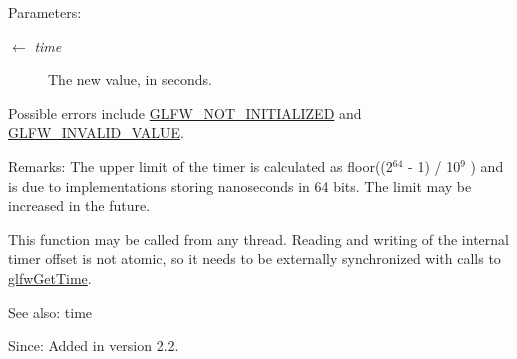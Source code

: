 \begin{Desc}
\item[Parameters:]
\begin{description}
\item[\mbox{$\leftarrow$} {\em time}]The new value, in seconds.\end{description}
\end{Desc}
Possible errors include \hyperlink{group__errors_g2374ee02c177f12e1fa76ff3ed15e14a}{GLFW\_\-NOT\_\-INITIALIZED} and \hyperlink{group__errors_gaf2ef9aa8202c2b82ac2d921e554c687}{GLFW\_\-INVALID\_\-VALUE}.

\begin{Desc}
\item[Remarks:]The upper limit of the timer is calculated as floor((2$^{\mbox{64}}$  - 1) / 10$^{\mbox{9}}$ ) and is due to implementations storing nanoseconds in 64 bits. The limit may be increased in the future.\end{Desc}
This function may be called from any thread. Reading and writing of the internal timer offset is not atomic, so it needs to be externally synchronized with calls to \hyperlink{group__input_g03d4a1039b8662c71eeb40beea8cb622}{glfwGetTime}.

\begin{Desc}
\item[See also:]time\end{Desc}
\begin{Desc}
\item[Since:]Added in version 2.2. \end{Desc}
